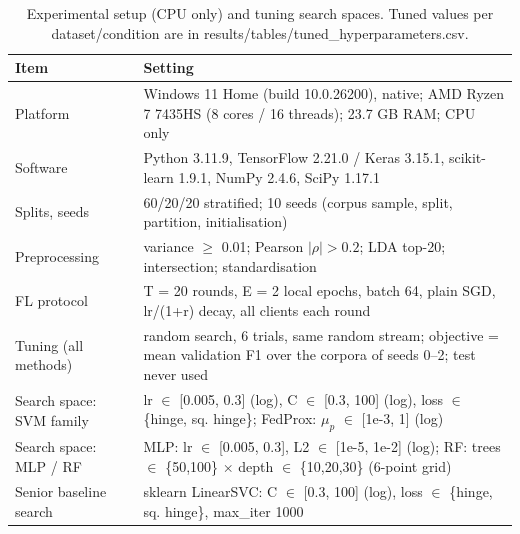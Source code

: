 \begin{table}[t]
\centering
\caption{Experimental setup (CPU only) and tuning search spaces. Tuned values per dataset/condition are in results/tables/tuned\_hyperparameters.csv.}
\label{tab:setup}
\tiny
\setlength{\tabcolsep}{2.4pt}
\begin{tabular}{p{2.6cm}p{14.4cm}}
\toprule
Item & Setting \\
\midrule
Platform & Windows 11 Home (build 10.0.26200), native; AMD Ryzen 7 7435HS (8 cores / 16 threads); 23.7 GB RAM; CPU only \\
Software & Python 3.11.9, TensorFlow 2.21.0 / Keras 3.15.1, scikit-learn 1.9.1, NumPy 2.4.6, SciPy 1.17.1 \\
Splits, seeds & 60/20/20 stratified; 10 seeds (corpus sample, split, partition, initialisation) \\
Preprocessing & variance $\ge$ 0.01; Pearson $|\rho|>0.2$; LDA top-20; intersection; standardisation \\
FL protocol & T = 20 rounds, E = 2 local epochs, batch 64, plain SGD, lr/(1+r) decay, all clients each round \\
Tuning (all methods) & random search, 6 trials, same random stream; objective = mean validation F1 over the corpora of seeds 0--2; test never used \\
Search space: SVM family & lr $\in$ [0.005, 0.3] (log), C $\in$ [0.3, 100] (log), loss $\in$ \{hinge, sq. hinge\}; FedProx: $\mu_p$ $\in$ [1e-3, 1] (log) \\
Search space: MLP / RF & MLP: lr $\in$ [0.005, 0.3], L2 $\in$ [1e-5, 1e-2] (log); RF: trees $\in$ \{50,100\} $\times$ depth $\in$ \{10,20,30\} (6-point grid) \\
Senior baseline search & sklearn LinearSVC: C $\in$ [0.3, 100] (log), loss $\in$ \{hinge, sq. hinge\}, max\_iter 1000 \\
\bottomrule
\end{tabular}
\end{table}
